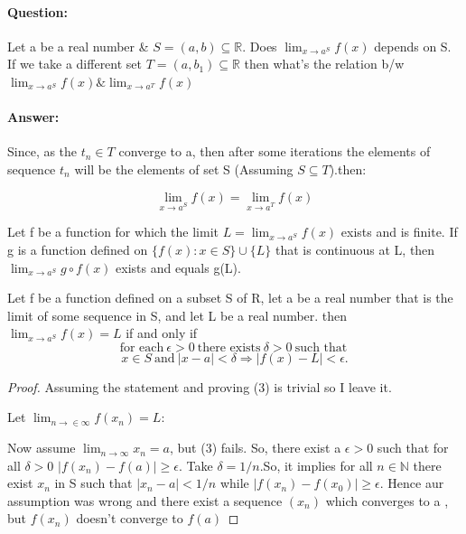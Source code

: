\documentclass{notes}
\begin{document}
\paragraph{Question:} Let a be a real number \& $S = (a,b) \subseteq \mathbb{R}$. Does $\lim_{x \to a^S} f(x)$ depends on S. If we take a different set $T = (a,b_1)\subseteq \mathbb{R}$ then what's the relation b/w 
$ \lim_{x \to a^S} f(x)  \&  \lim_{x \to a^T} f(x)$
\paragraph{Answer:} Since, as the $t_n \in T$ converge to a, then after some iterations the elements of sequence $t_n$ will be the elements of set S (Assuming $ S \subseteq T$).then:

$$ \lim_{x \to a^S} f(x)  = \lim_{x \to a^T} f(x)$$

\begin{theorem}{}
	Let f be a function for which the limit $L = \lim_{x\to a^S} f(x)$ exists and
	is finite. If g is a function defined on $\{f(x) : x \in S\} \cup \{L\}$ that is
	continuous at L, then $\lim_{x\to a^S} g\circ f (x)$ exists and equals g(L).
\end{theorem}
\begin{theorem}{}
	Let f be a function defined on a subset S of R, let a be a real number
	that is the limit of some sequence in S, and let L be a real number.
	then $\lim_{x \to a^S} f(x) = L$ if and only if
	\begin{equation*}
	\text{for each}\ \epsilon>0\ \text{there exists}\ \delta> 0\ \text{such that}\ 
	\end{equation*}
	\begin{equation}
	x\in S\ \text{and}\ |x - a| < \delta \Rightarrow |f(x) - L| < \epsilon.
	\end{equation}
\end{theorem}
\begin{proof}
	Assuming the statement and proving (3) is trivial so I leave it.
	
	Let $\lim_{n \to \in \infty } f(x_n) = L$:
	
	
	Now assume $\lim_{n \to  \infty} x_n = a$, but (3) fails. So, there exist a $\epsilon>0$ such that for all $\delta >0$ $|f(x_n) - f(a) |\geq \epsilon$. Take $\delta = 1/n$.So, it implies for all  $n\in \mathbb{N}$  there exist $x_n$ in S such that $|x_n - a| < 1/n$ while $|f(x_n) - f(x_0) |\geq \epsilon$. Hence aur assumption was wrong and there exist a sequence $(x_n)$ which converges to a , but $f(x_n)$ doesn't converge to $f(a)$
\end{proof}
\end{document}
